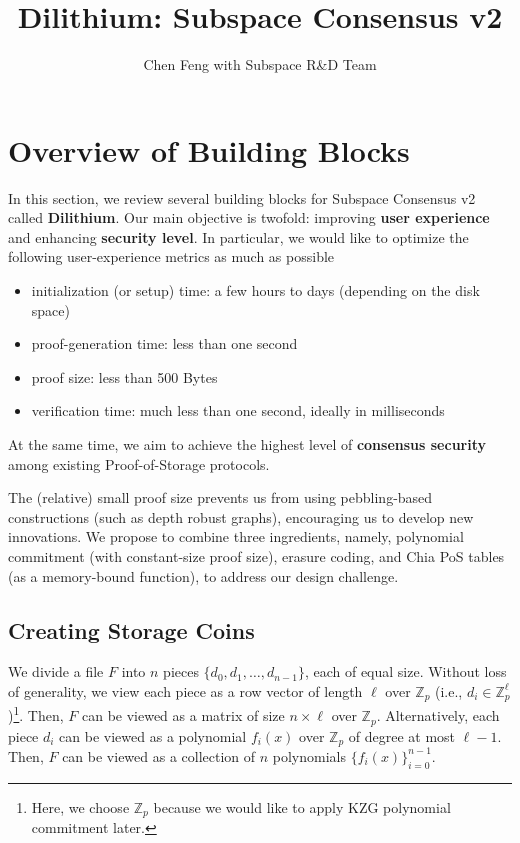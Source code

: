 \documentclass[12pt,draftcls,onecolumn]{IEEEtran}
\title{Dilithium: Subspace Consensus v2}
\author{Chen Feng with Subspace R\&D Team}
\newcommand{\Fp}{\mathbb{Z}_p}
\begin{document}
\maketitle


\section{Overview of Building Blocks}

In this section, we review several building blocks for Subspace Consensus v2 called {\bf Dilithium}. 
Our main objective is twofold: improving {\bf user experience} and enhancing {\bf security level}.
In particular, we would like to optimize the following user-experience metrics as much as possible
\begin{itemize}
    \item initialization (or setup) time: a few hours to days (depending on the disk space)
    \item proof-generation time: less than one second
    \item proof size: less than 500 Bytes
    \item verification time: much less than one second, ideally in milliseconds
\end{itemize}
At the same time, we aim to achieve the highest level of {\bf consensus security} among existing Proof-of-Storage protocols. 

The (relative) small proof size prevents us from using pebbling-based constructions (such as depth robust graphs), encouraging us to develop new innovations. We propose to combine three ingredients, namely, polynomial commitment (with constant-size proof size), erasure coding, and Chia PoS tables (as a memory-bound function), to address our design challenge.  

\subsection{Creating Storage Coins}

We divide a file $F$ into $n$ pieces $\{ d_0, d_1, \ldots, d_{n-1}\}$, each of equal size. 
Without loss of generality, we view each piece as a row vector of length $\ell$ over $\Fp$  (i.e., $d_i \in \Fp^\ell$)\footnote{Here, we choose $\Fp$ because we would like to apply KZG polynomial commitment later.}.
Then, $F$ can be viewed as a matrix of size $n \times \ell$ over $\Fp$.
Alternatively, each piece $d_i$ can be viewed as a polynomial $f_i(x)$ over $\Fp$ of degree at most $\ell - 1$. 
Then, $F$ can be viewed as a collection of $n$ polynomials $\{ f_i(x) \}_{i = 0}^{n-1}$. 
\end{document}
